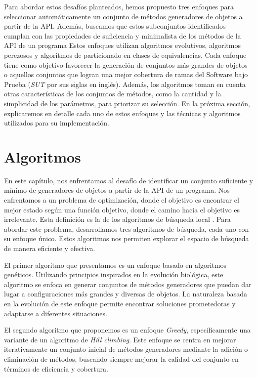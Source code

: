 Para abordar estos desafíos planteados, hemos propuesto tres enfoques para seleccionar automáticamente un conjunto de métodos generadores de objetos a partir de la API. Además, buscamos que estos subconjuntos identificados cumplan con las propiedades de suficiencia y minimalista de los métodos de la API de un programa  Estos enfoques utilizan algoritmos evolutivos, algoritmos perezosos y algoritmos de particionado en clases de equivalencias. Cada enfoque tiene como objetivo favorecer la generación de conjuntos más grandes de objetos o aquellos conjuntos que logran una mejor cobertura de ramas del Software bajo Prueba (\emph{SUT} por sus siglas en inglés). Además, los algoritmos toman en cuenta otras características de los conjuntos de métodos, como la cantidad y la simplicidad de los parámetros, para priorizar su selección. En la próxima sección, explicaremos en detalle cada uno de estos enfoques y las técnicas y algoritmos utilizados para su implementación.


\section{Algoritmos}
\label{sec:algorithms}


En este capítulo, nos enfrentamos al desafío de identificar un conjunto suficiente y mínimo de generadores de objetos a partir de la API de un programa. Nos enfrentamos a un problema de optimización, donde el objetivo es encontrar el mejor estado según una función objetivo, donde el camino hacia el objetivo es irrelevante. Esta definición es la de los algoritmos de búsqueda local \cite{Russell:2009}. Para abordar este problema, desarrollamos tres algoritmos de búsqueda, cada uno con su enfoque único. Estos algoritmos nos permiten explorar el espacio de búsqueda de manera eficiente y efectiva.

El primer algoritmo que presentamos es un enfoque basado en algoritmos genéticos. Utilizando principios inspirados en la evolución biológica, este algoritmo se enfoca en generar conjuntos de métodos generadores que puedan dar lugar a configuraciones más grandes y diversas de objetos. La naturaleza basada en la evolución de este enfoque permite encontrar soluciones prometedoras y adaptarse a diferentes situaciones.

El segundo algoritmo que proponemos es un enfoque \emph{Greedy}, específicamente una variante de un algoritmo de \emph{Hill climbing}. Este enfoque se centra en mejorar iterativamente un conjunto inicial de métodos generadores mediante la adición o eliminación de métodos, buscando siempre mejorar la calidad del conjunto en términos de eficiencia y cobertura.


